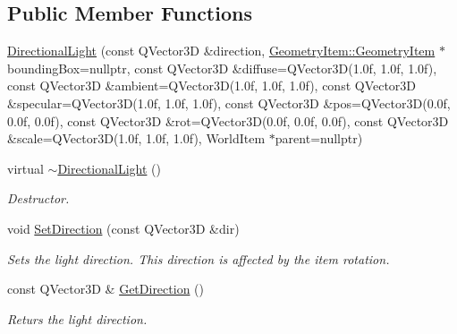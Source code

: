 \subsection*{Public Member Functions}
\begin{DoxyCompactItemize}
\item 
\mbox{\hyperlink{class_geometry_engine_1_1_geometry_world_item_1_1_geometry_light_1_1_directional_light_ab11752fa06e7f257334bf12cab849139}{Directional\+Light}} (const Q\+Vector3D \&direction, \mbox{\hyperlink{class_geometry_engine_1_1_geometry_world_item_1_1_geometry_item_1_1_geometry_item}{Geometry\+Item\+::\+Geometry\+Item}} $\ast$bounding\+Box=nullptr, const Q\+Vector3D \&diffuse=Q\+Vector3D(1.\+0f, 1.\+0f, 1.\+0f), const Q\+Vector3\+D \&ambient=\+Q\+Vector3\+D(1.\+0f, 1.\+0f, 1.\+0f), const Q\+Vector3\+D \&specular=\+Q\+Vector3\+D(1.\+0f, 1.\+0f, 1.\+0f), const Q\+Vector3\+D \&pos=\+Q\+Vector3\+D(0.\+0f, 0.\+0f, 0.\+0f), const Q\+Vector3\+D \&rot=\+Q\+Vector3\+D(0.\+0f, 0.\+0f, 0.\+0f), const Q\+Vector3\+D \&scale=\+Q\+Vector3\+D(1.\+0f, 1.\+0f, 1.\+0f), World\+Item $\ast$parent=nullptr)
\item 
\mbox{\label{class_geometry_engine_1_1_geometry_world_item_1_1_geometry_light_1_1_directional_light_a3f337a552f7d5700e2149fce03e4fbf1}} 
virtual \mbox{\hyperlink{class_geometry_engine_1_1_geometry_world_item_1_1_geometry_light_1_1_directional_light_a3f337a552f7d5700e2149fce03e4fbf1}{$\sim$\+Directional\+Light}} ()
\begin{DoxyCompactList}\small\item\em Destructor. \end{DoxyCompactList}\item 
\mbox{\label{class_geometry_engine_1_1_geometry_world_item_1_1_geometry_light_1_1_directional_light_a5cac3a371ef72b22c962a4432fa3afa3}} 
void \mbox{\hyperlink{class_geometry_engine_1_1_geometry_world_item_1_1_geometry_light_1_1_directional_light_a5cac3a371ef72b22c962a4432fa3afa3}{Set\+Direction}} (const Q\+Vector3D \&dir)
\begin{DoxyCompactList}\small\item\em Sets the light direction. This direction is affected by the item rotation. \end{DoxyCompactList}\item 
\mbox{\label{class_geometry_engine_1_1_geometry_world_item_1_1_geometry_light_1_1_directional_light_a4e5ea81192c5ddab2da4b58b6209b61a}} 
const Q\+Vector3D \& \mbox{\hyperlink{class_geometry_engine_1_1_geometry_world_item_1_1_geometry_light_1_1_directional_light_a4e5ea81192c5ddab2da4b58b6209b61a}{Get\+Direction}} ()
\begin{DoxyCompactList}\small\item\em Returs the light direction. \end{DoxyCompactList}\end{DoxyCompactItemize}
